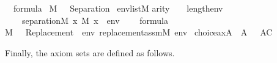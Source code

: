 \begin{isabelle}
{\isasymphi}\ {\isasymin}\ formula\ {\isasymLongrightarrow}\isanewline
{\isacharparenleft}{\kern0pt}M{\isacharcomma}{\kern0pt}\ {\isacharbrackleft}{\kern0pt}{\isacharbrackright}{\kern0pt}\ {\isasymTurnstile}\ {\isasymcdot}Separation{\isacharparenleft}{\kern0pt}{\isasymphi}{\isacharparenright}{\kern0pt}{\isasymcdot}{\isacharparenright}{\kern0pt}\ {\isasymlongleftrightarrow}\isanewline
{\isacharparenleft}{\kern0pt}{\isasymforall}env{\isasymin}list{\isacharparenleft}{\kern0pt}M{\isacharparenright}{\kern0pt}{\isachardot}{\kern0pt}\isanewline
\isaindent{{\isacharparenleft}{\kern0pt}\ \ \ }arity{\isacharparenleft}{\kern0pt}{\isasymphi}{\isacharparenright}{\kern0pt}\ {\isasymle}\ {}\ {\isacharplus}{\kern0pt}\isactrlsub {\isasymomega}\ length{\isacharparenleft}{\kern0pt}env{\isacharparenright}{\kern0pt}\ {\isasymlongrightarrow}\isanewline
\ \ \ \ separation{\isacharparenleft}{\kern0pt}{\isacharhash}{\kern0pt}{\isacharhash}{\kern0pt}M{\isacharcomma}{\kern0pt}\ {\isasymlambda}x{\isachardot}{\kern0pt}\ M{\isacharcomma}{\kern0pt}\ {\isacharbrackleft}{\kern0pt}x{\isacharbrackright}{\kern0pt}\ {\isacharat}{\kern0pt}\ env\ {\isasymTurnstile}\ {\isasymphi}{\isacharparenright}{\kern0pt}{\isacharparenright}{\kern0pt}\isasep\isanewline\isanewline%
{\isasymphi}\ {\isasymin}\ formula\ {\isasymLongrightarrow}\isanewline
{\isacharparenleft}{\kern0pt}M{\isacharcomma}{\kern0pt}\ {\isacharbrackleft}{\kern0pt}{\isacharbrackright}{\kern0pt}\ {\isasymTurnstile}\ {\isasymcdot}Replacement{\isacharparenleft}{\kern0pt}{\isasymphi}{\isacharparenright}{\kern0pt}{\isasymcdot}{\isacharparenright}{\kern0pt}\ {\isasymlongleftrightarrow}\ {\isacharparenleft}{\kern0pt}{\isasymforall}env{\isachardot}{\kern0pt}\ replacement{\isacharunderscore}{\kern0pt}assm{\isacharparenleft}{\kern0pt}M{\isacharcomma}{\kern0pt}\ env{\isacharcomma}{\kern0pt}\ {\isasymphi}{\isacharparenright}{\kern0pt}{\isacharparenright}\isanewline\isanewline%
choice{\isacharunderscore}{\kern0pt}ax{\isacharparenleft}{\kern0pt}{\isacharhash}{\kern0pt}{\isacharhash}{\kern0pt}A{\isacharparenright}{\kern0pt}\ {\isasymlongleftrightarrow}\ A{\isacharcomma}{\kern0pt}\ {\isacharbrackleft}{\kern0pt}{\isacharbrackright}{\kern0pt}\ {\isasymTurnstile}\ {\isasymcdot}AC{\isasymcdot}%
\end{isabelle}%

Finally, the axiom sets are defined as follows.

